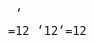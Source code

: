 \def\q{\par\begingroup\tt
\obeylines \catcode`\\=12
\catcode`{12\catcode`}=12
\obeyspaces\jobname
\endgroup}\q\bye
